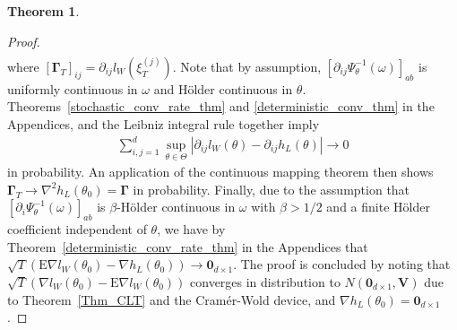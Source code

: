 \documentclass[11pt]{article}
\numberwithin{equation}{section}
\theoremstyle{plain}
\theoremstyle{definition}
\theoremstyle{definition}
\theoremstyle{assumption}
\theoremstyle{proposition}
\theoremstyle{proposition}
\theoremstyle{example}
\theoremstyle{lemma}
\theoremstyle{theorem}
\newtheorem{theorem}{Theorem}[section]
\theoremstyle{remark}
\begin{document}
\begin{theorem}
\begin{proof}
\begin{align*}
\end{align*}
where $[\boldsymbol{\Gamma}_T]_{ij} = \partial_{ij}l_W(\xi_T^{(j)})$. Note that by assumption, $[\partial_{ij}\Psi_{\theta}^{-1}(\omega)]_{ab}$ is uniformly continuous in $\omega$ and H{\"o}lder continuous in $\theta$. Theorems~\ref{stochastic_conv_rate_thm} and \ref{deterministic_conv_thm} in the Appendices, and the Leibniz integral rule together imply 
\begin{align*}
\sum_{i,j=1}^{d}\sup_{\theta\in\Theta}|\partial_{ij}l_W(\theta) - \partial_{ij}h_L(\theta)| \rightarrow 0   
\end{align*}
in probability. An application of the continuous mapping theorem then shows $\boldsymbol{\Gamma}_T \rightarrow\nabla^2 h_L(\theta_0)=\boldsymbol{\Gamma}$ in probability. Finally, due to the assumption that $[\partial_{i}\Psi_{\theta}^{-1}(\omega)]_{ab}$ is $\beta$-H{\"o}lder continuous in $\omega$ with $\beta>1/2$ and a finite H{\"o}lder coefficient independent of $\theta$, we have by Theorem~\ref{deterministic_conv_rate_thm} in the Appendices that $\sqrt{T}(\mathrm{E}\nabla l_W(\theta_0) - \nabla h_L(\theta_0))\rightarrow \boldsymbol{0}_{d\times1}$. The proof is concluded by noting that $\sqrt{T}(\nabla l_W(\theta_0) - \mathrm{E}\nabla l_W(\theta_0))$ converges in distribution to $N(\boldsymbol{0}_{d\times1}, \boldsymbol{V})$ due to Theorem~\ref{Thm_CLT} and the Cram\'er-Wold device, and $\nabla h_L(\theta_0) = \boldsymbol{0}_{d\times1}$.

\end{proof}

\end{theorem}
\end{document}
